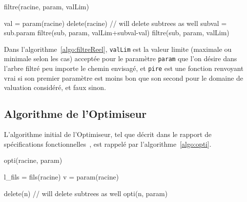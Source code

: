  	\begin{algorithm}[H]
            \caption{filtre(racine, param, valLim)}
            \label{algo:filtreReel}
            \begin{algorithmic}
	\STATE val = param(racine)
	\STATE
		\STATE delete(racine) // will delete subtrees as well
		\RETURN
	\STATE
	\ELSE
				\STATE subval = sub.param
				\STATE filtre(sub, param, valLim+subval-val)
			\ENDFOR
		\ELSE
				\STATE filtre(sub, param, valLim)
			\ENDFOR
		\ENDIF
	\ENDIF
            \end{algorithmic}
        \end{algorithm}

    Dans l'{\sc algorithme}~\ref{algo:filtreReel}, \verb|valLim| est la valeur limite (maximale ou minimale selon les cas) acceptée pour le paramètre \verb|param| que l'on désire dans l'arbre filtré peu importe le chemin envisagé, et  \verb|pire| est une fonction renvoyant vrai  si son premier paramètre est moins bon que son second pour le domaine de valuation considéré, et 
		faux  sinon.

\subsection{Algorithme de l'Optimiseur}
\label{ssec:algoOptim}

    L'algorithme initial de l'Optimiseur, tel que décrit dans le rapport de spécifications fonctionnelles~\cite{spec_fonc}, est rappelé par l'{\sc algorithme}~\ref{algo:opti}.

         \begin{algorithm}[H]
            \caption{opti(racine, param)}
            \label{algo:opti}
            \begin{algorithmic}
                \STATE l\_fils = fils(racine)
                    \RETURN
                \ENDIF
                \STATE
                    \STATE v = param(racine)

                            \STATE delete(n) // will delete subtrees as well
                        \ENDIF
                    \ENDFOR
                \ENDIF
                \STATE
                    \STATE opti(n, param)
                \ENDFOR
            \end{algorithmic}
        \end{algorithm}

